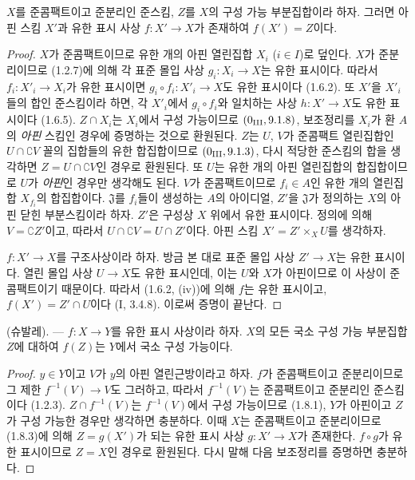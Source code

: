 \begin{lemma}[1.8.3]
\label{IV.1.8.3-fr}
$X$를 준콤팩트이고 준분리인 준스킴, $Z$를 $X$의 구성 가능
부분집합이라 하자. 그러면 아핀 스킴 $X'$과 유한 표시 사상
$f:X'\to X$가 존재하여 $f(X')=Z$이다.
\end{lemma}

\begin{proof}
$X$가 준콤팩트이므로 유한 개의 아핀 열린집합 $X_i$ ($i\in I$)로
덮인다. $X$가 준분리이므로 (1.2.7)에 의해 각 표준 몰입 사상
$g_i:X_i\to X$는 유한 표시이다. 따라서 $f_i:X'_i\to X_i$가 유한
표시이면 $g_i\circ f_i:X'_i\to X$도 유한 표시이다 (1.6.2). 또
$X'$을 $X'_i$들의 합인 준스킴이라 하면, 각 $X'_i$에서
$g_i\circ f_i$와 일치하는 사상 $h:X'\to X$도 유한 표시이다
(1.6.5). $Z\cap X_i$는 $X_i$에서 구성 가능이므로
$(0\textsubscript{III}, 9.1.8)$, 보조정리를 $X_i$가 환 $A$의
\emph{아핀} 스킴인 경우에 증명하는 것으로 환원된다.
$Z$는 $U$, $V$가 준콤팩트 열린집합인 $U\cap\complement V$ 꼴의
집합들의 유한 합집합이므로 $(0\textsubscript{III}, 9.1.3)$, 다시
적당한 준스킴의 합을 생각하면 $Z=U\cap\complement V$인 경우로
환원된다. 또 $U$는 유한 개의 아핀 열린집합의 합집합이므로 $U$가
\emph{아핀}인 경우만 생각해도 된다. $V$가 준콤팩트이므로
$f_i\in A$인 유한 개의 열린집합 $X_{f_i}$의 합집합이다.
$\mathfrak J$를 $f_i$들이 생성하는 $A$의 아이디얼, $Z'$을
$\mathfrak J$가 정의하는 $X$의 아핀 닫힌 부분스킴이라 하자. $Z'$은
구성상 $X$ 위에서 유한 표시이다. 정의에 의해 $V=\complement Z'$이고,
따라서 $U\cap\complement V=U\cap Z'$이다. 아핀 스킴
$X'=Z'\times_XU$를 생각하자.


$f:X'\to X$를 구조사상이라 하자. 방금 본 대로 표준 몰입 사상
$Z'\to X$는 유한 표시이다. 열린 몰입 사상 $U\to X$도 유한
표시인데, 이는 $U$와 $X$가 아핀이므로 이 사상이 준콤팩트이기
때문이다. 따라서 (1.6.2, (iv))에 의해 $f$는 유한 표시이고,
$f(X')=Z'\cap U$이다 (I, 3.4.8). 이로써 증명이 끝난다.
\end{proof}

\begin{theorem}[1.8.4]
\label{IV.1.8.4-fr}
\textup{(슈발레).} --- $f:X\to Y$를 유한 표시 사상이라 하자. $X$의
모든 국소 구성 가능 부분집합 $Z$에 대하여 $f(Z)$는 $Y$에서 국소
구성 가능이다.
\end{theorem}

\begin{proof}
$y\in Y$이고 $V$가 $y$의 아핀 열린근방이라고 하자. $f$가
준콤팩트이고 준분리이므로 그 제한 $f^{-1}(V)\to V$도 그러하고,
따라서 $f^{-1}(V)$는 준콤팩트이고 준분리인 준스킴이다 (1.2.3).
$Z\cap f^{-1}(V)$는 $f^{-1}(V)$에서 구성 가능이므로 (1.8.1), $Y$가
아핀이고 $Z$가 구성 가능한 경우만 생각하면 충분하다. 이때 $X$는
준콤팩트이고 준분리이므로 (1.8.3)에 의해 $Z=g(X')$가 되는 유한 표시
사상 $g:X'\to X$가 존재한다. $f\circ g$가 유한 표시이므로 $Z=X$인
경우로 환원된다. 다시 말해 다음 보조정리를 증명하면 충분하다.
\end{proof}

